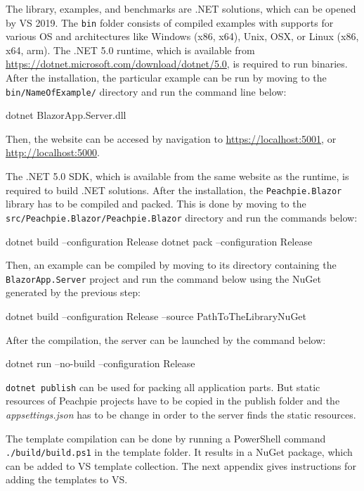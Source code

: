 The library, examples, and benchmarks are .NET solutions, which can be opened by \ac{VS} 2019.
The \texttt{bin} folder consists of compiled examples with supports for various OS and architectures like Windows (x86, x64), Unix, OSX, or Linux (x86, x64, arm).
The .NET 5.0 runtime, which is available from \url{https://dotnet.microsoft.com/download/dotnet/5.0}, is required to run binaries.
After the installation, the particular example can be run by moving to the \texttt{bin/NameOfExa\-mple/} directory and run the command line below:
\par
\begin{code}[frame=none]
dotnet BlazorApp.Server.dll
\end{code}
\par
Then, the website can be accesed by navigation to \url{https://localhost:5001}, or \url{http://localhost:5000}.
\par
The .NET 5.0 SDK, which is available from the same website as the runtime, is required to build .NET solutions.
After the installation, the \texttt{Peachpie.Blazor} library has to be compiled and packed. 
This is done by moving to the \texttt{src/Peach\-pie.Blazor/Peachpie.Blazor} directory and run the commands below:
\par
\begin{code}[frame=none]
dotnet build --configuration Release
dotnet pack --configuration Release
\end{code}
\par
Then, an example can be compiled by moving to its directory containing the \texttt{BlazorApp.Server} project and run the command below using the NuGet generated by the previous step:
\par
\begin{code}[frame=none]
dotnet build --configuration Release --source PathToTheLibraryNuGet
\end{code}
\par
After the compilation, the server can be launched by the command below:
\par
\begin{code}[frame=none]
dotnet run --no-build --configuration Release
\end{code}
\par
\texttt{dotnet publish} can be used for packing all application parts. But static resources of Peachpie projects have to be copied in the publish folder and the \textit{appsettings.json} has to be change in order to the server finds the static resources. 
\par
The template compilation can be done by running a PowerShell command \texttt{./build/build.ps1} in the template folder.
It results in a NuGet package, which can be added to VS template collection.
The next appendix gives instructions for adding the templates to VS.